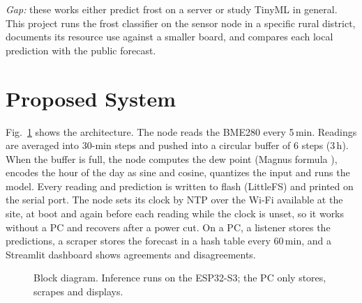 \documentclass[conference]{IEEEtran}
\begin{document}
\textit{Gap:} these works either predict frost on a server or study TinyML in general. This project runs the frost classifier on the sensor node in a specific rural district, documents its resource use against a smaller board, and compares each local prediction with the public forecast.

\section{Proposed System}
Fig.~\ref{fig:block} shows the architecture. The node reads the BME280 every 5\,min. Readings are averaged into 30-min steps and pushed into a circular buffer of 6 steps (3\,h). When the buffer is full, the node computes the dew point (Magnus formula \cite{alduchov1996}), encodes the hour of the day as sine and cosine, quantizes the input and runs the model. Every reading and prediction is written to flash (LittleFS) and printed on the serial port. The node sets its clock by NTP over the Wi-Fi available at the site, at boot and again before each reading while the clock is unset, so it works without a PC and recovers after a power cut. On a PC, a listener stores the predictions, a scraper stores the forecast in a hash table every 60\,min, and a Streamlit dashboard shows agreements and disagreements.

\begin{figure}[t]
\centering
{}
\caption{Block diagram. Inference runs on the ESP32-S3; the PC only stores, scrapes and displays.}
\label{fig:block}
\end{figure}
\end{document}
